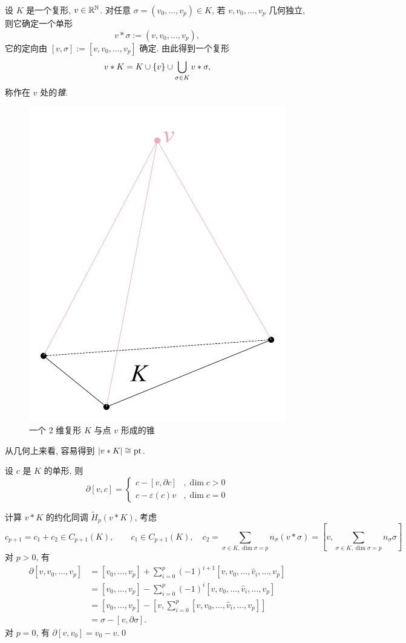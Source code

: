 	\begin{Definition}[锥]
		设 $ K $ 是一个复形, $ v\in\mathbb{R}^{\mathbb{N}} $. 对任意 $ \sigma=(v_0,\dots,v_p)\in K $, 若 $ v,v_0,\dots,v_p $ 几何独立, 则它确定一个单形
		\[
			v*\sigma:=(v,v_0,\dots,v_p),
		\]
		它的定向由 $ [v,\sigma]:=[v,v_0,\dots,v_p] $ 确定. 由此得到一个复形
		\[
			v*K=K\cup\left\{ v \right\}\cup\bigcup_{\sigma\in K}v*\sigma,
		\]
		称作在 $ v $ 处的\emph{锥}.
	\end{Definition}

	\begin{figure}[htbp]
		\centering
		\includegraphics[width=0.2\linewidth]{figures/Sec3-12.png}
		\caption{一个 2 维复形 $ K $ 与点 $ v $ 形成的锥}
	\end{figure}

	从几何上来看, 容易得到 $ \left| v*K \right| \cong\mathrm{pt} $.

	\begin{Lemma}
		设 $ c $ 是 $ K $ 的单形, 则
		\[
			\partial[v,c]=\begin{cases}
				c-[v,\partial c] & ,\dim c>0\\
				c-\varepsilon(c)v & ,\dim c=0
			\end{cases}
		\]
	\end{Lemma}
	\begin{Proof}
		计算 $ v*K $ 的约化同调 $ \tilde{H}_p(v*K) $, 考虑
		\[
			c_{p+1}=c_1+c_2\in C_{p+1}(K),\qquad c_1\in C_{p+1}(K),\quad c_2=\sum_{\sigma\in K,\dim\sigma=p}n_\sigma(v*\sigma)=\left[ v,\sum_{\sigma\in K,\dim\sigma=p}n_\sigma\sigma \right]
		\]
		对 $ p>0 $, 有
		\[
			\begin{aligned}
				\partial[v,v_0,\dots,v_p]&=[v_0,\dots,v_p]+\sum_{i=0}^p(-1)^{i+1}[v,v_0,\dots,\hat{v}_i,\dots,v_p]\\
				&=[v_0,\dots,v_p]-\sum_{i=0}^p(-1)^i[v,v_0,\dots,\hat{v}_i,\dots,v_p]\\
				&=[v_0,\dots,v_p]-\left[ v,\sum_{i=0}^p[v,v_0,\dots,\hat{v}_i,\dots,v_p] \right]\\
				&=\sigma-[v,\partial\sigma].
			\end{aligned}
		\]
		对 $ p=0 $, 有 $ \partial[v,v_0]=v_0-v $.\qed
	\end{Proof}

